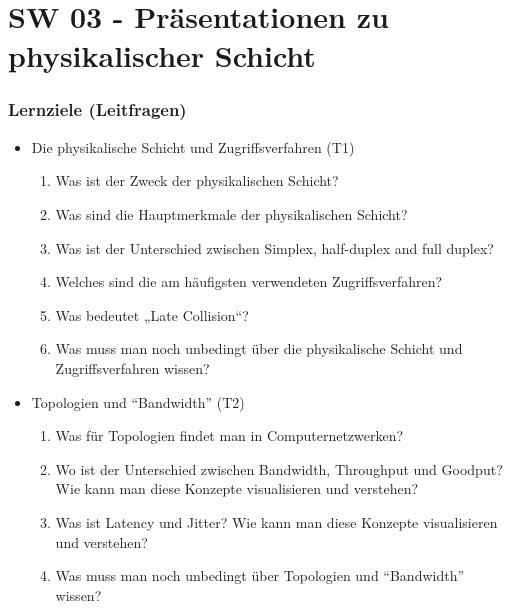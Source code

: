 \part{SW 03 - Präsentationen zu physikalischer Schicht}
\section{Lernziele (Leitfragen)}
\begin{itemize}
    \item Die physikalische Schicht und Zugriffsverfahren (T1)
    \begin{enumerate}
        \item Was ist der Zweck der physikalischen Schicht?
        \item Was sind die Hauptmerkmale der physikalischen Schicht?
        \item Was ist der Unterschied zwischen \flqq{}Simplex\frqq, \flqq{}half-duplex\frqq{} and \flqq{}full duplex\frqq?
        \item Welches sind die am häufigsten verwendeten Zugriffsverfahren?
        \item Was bedeutet „Late Collision“?
        \item Was muss man noch unbedingt über die physikalische Schicht und Zugriffsverfahren wissen?\\
    \end{enumerate}

    \item Topologien und ``Bandwidth'' (T2)
    \begin{enumerate}
        \item Was für Topologien findet man in Computernetzwerken?
        \item Wo ist der Unterschied zwischen \flqq{}Bandwidth\frqq, \flqq{}Throughput\frqq{} und \flqq{}Goodput\frqq? Wie kann man diese Konzepte visualisieren und verstehen?
        \item Was ist \flqq{}Latency\frqq{} und \flqq{}Jitter\frqq? Wie kann man diese Konzepte visualisieren und verstehen?
        \item Was muss man noch unbedingt über Topologien und ``Bandwidth'' wissen?\\
    \end{enumerate}


\end{itemize}
